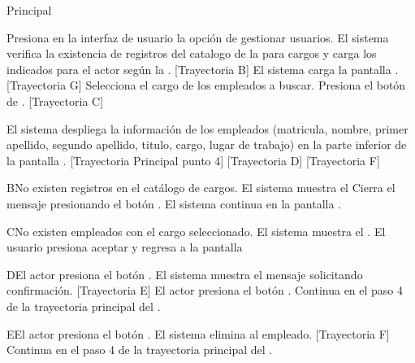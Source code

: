 \begin{UCtrayectoria}{Principal}
	
	\UCpaso[\UCactor] Presiona en la interfaz de usuario  la opción de gestionar usuarios. 
	\UCpaso  El sistema verifica la existencia de registros del catalogo de la  para cargos  y carga los indicados para el actor según la  . [Trayectoria B] 
	\UCpaso El sistema carga la pantalla  . [Trayectoria G] 
	\UCpaso[\UCactor] Selecciona el cargo de los empleados a buscar. 
	\UCpaso[\UCactor]  Presiona el botón de .  [Trayectoria C] 
	
	\UCpaso El sistema despliega la información de los empleados (matricula,  nombre, primer apellido, segundo apellido, titulo, cargo, lugar de trabajo) en la parte inferior de la pantalla . [Trayectoria Principal punto 4] [Trayectoria D] [Trayectoria F] 
\end{UCtrayectoria}

\begin{UCtrayectoriaA}{B}{No existen registros en el catálogo de cargos.}
	\UCpaso     El sistema muestra el 	
	\UCpaso[\UCactor] Cierra el mensaje presionando el botón .
	\UCpaso  El sistema continua en la pantalla  .
\end{UCtrayectoriaA}

\begin{UCtrayectoriaA}{C}{No existen  empleados con el cargo seleccionado.}
	\UCpaso     El sistema muestra el .
	\UCpaso[\UCactor] El usuario presiona aceptar y regresa a la pantalla   
\end{UCtrayectoriaA}


\begin{UCtrayectoriaA}{D}{El actor presiona el botón .}
	\UCpaso El sistema muestra el mensaje  solicitando confirmación. [Trayectoria E]
	\UCpaso[\UCactor] El actor presiona el botón .
	\UCpaso Continua en el paso 4 de la trayectoria principal del .  	
\end{UCtrayectoriaA}

\begin{UCtrayectoriaA}{E}{El actor presiona el botón .}
	\UCpaso     El sistema elimina al empleado. [Trayectoria F] 
	\UCpaso Continua en el paso 4 de la trayectoria principal del .  
\end{UCtrayectoriaA}

